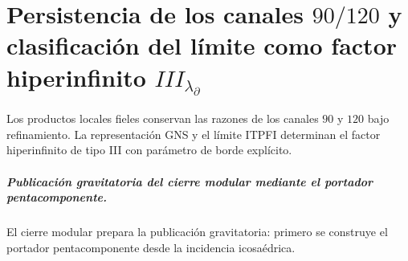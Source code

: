 \chapter{Persistencia de los canales \texorpdfstring{\(90/120\)}{90/120} y clasificación del límite como factor hiperinfinito \texorpdfstring{\(III_{\lambda_\partial}\)}{III(lambda parcial)}}
\label{chap:parte-iv-62}

Los productos locales fieles conservan las razones de los canales \(90\) y \(120\) bajo refinamiento. La representación GNS y el límite ITPFI determinan el factor hiperinfinito de tipo III con parámetro de borde explícito.



\paragraph{Publicación gravitatoria del cierre modular mediante el portador pentacomponente.} El cierre modular prepara la publicación gravitatoria: primero se construye el portador pentacomponente desde la incidencia icosaédrica.
